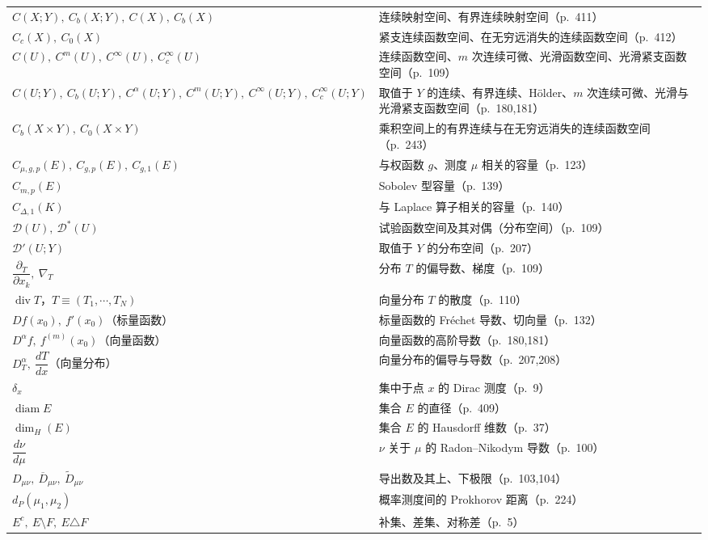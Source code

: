 \documentclass[../main.tex]{subfiles}
\begin{document}
\begin{longtable}{p{}p{}}
$C(X;Y),\ C_b(X;Y),\ C(X),\ C_b(X)$ & 连续映射空间、有界连续映射空间（p.~411）\\
$C_c(X),\ C_0(X)$ & 紧支连续函数空间、在无穷远消失的连续函数空间（p.~412）\\
$C(U),\ C^m(U),\ C^\infty(U),\ C^\infty_c(U)$ & 连续函数空间、$m$ 次连续可微、光滑函数空间、光滑紧支函数空间（p.~109）\\
$C(U;Y),\ C_b(U;Y),\ C^\alpha(U;Y),\ C^m(U;Y),\ C^\infty(U;Y),\ C^\infty_c(U;Y)$ & 取值于 $Y$ 的连续、有界连续、Hölder、$m$ 次连续可微、光滑与光滑紧支函数空间（p.~180,181）\\
$C_b(X\times Y),\ C_0(X\times Y)$ & 乘积空间上的有界连续与在无穷远消失的连续函数空间（p.~243）\\
$C_{\mu,g,p}(E),\ C_{g,p}(E),\ C_{g,1}(E)$ & 与权函数 $g$、测度 $\mu$ 相关的容量（p.~123）\\
$C_{m,p}(E)$ & Sobolev 型容量（p.~139）\\
$C_{\Delta,1}(K)$ & 与 Laplace 算子相关的容量（p.~140）\\
$\mathcal{D}(U),\ \mathcal{D}^*(U)$ & 试验函数空间及其对偶（分布空间）（p.~109）\\
$\mathcal{D}'(U;Y)$ & 取值于 $Y$ 的分布空间（p.~207）\\
$\dfrac{\partial_T}{\partial x_k},\ \nabla_T$ & 分布 $T$ 的偏导数、梯度（p.~109）\\
$\operatorname{div}T$，$T\equiv(T_1,\cdots ,T_N)$ & 向量分布 $T$ 的散度（p.~110）\\
$Df(x_0),\ f'(x_0)$（标量函数） & 标量函数的 Fréchet 导数、切向量（p.~132）\\
$D^\alpha f,\ f^{(m)}(x_0)$（向量函数） & 向量函数的高阶导数（p.~180,181）\\
$D_T^\alpha,\ \dfrac{dT}{dx}$（向量分布） & 向量分布的偏导与导数（p.~207,208）\\
$\delta_x$ & 集中于点 $x$ 的 Dirac 测度（p.~9）\\
$\operatorname{diam}E$ & 集合 $E$ 的直径（p.~409）\\
$\dim_H(E)$ & 集合 $E$ 的 Hausdorff 维数（p.~37）\\
$\dfrac{d\nu}{d\mu}$ & $\nu$ 关于 $\mu$ 的 Radon--Nikodym 导数（p.~100）\\
$D_{\mu\nu},\ \overline{D}_{\mu\nu},\ \widetilde{D}_{\mu\nu}$ & 导出数及其上、下极限（p.~103,104）\\
$d_P(\mu_1,\mu_2)$ & 概率测度间的 Prokhorov 距离（p.~224）\\
$E^c,\ E\setminus F,\ E\triangle F$ & 补集、差集、对称差（p.~5）\\

\end{longtable}
\end{document}
